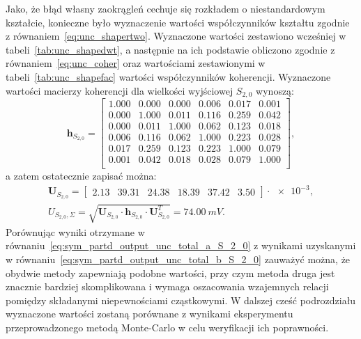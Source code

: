 Jako, że błąd własny zaokrągleń cechuje się rozkładem o niestandardowym kształcie, konieczne było wyznaczenie wartości współczynników kształtu zgodnie z równaniem~\eqref{eq:unc_shapertwo}. Wyznaczone wartości zestawiono wcześniej w tabeli~\ref{tab:unc_shapedwt}, a następnie na ich podstawie obliczono zgodnie z równaniem~\eqref{eq:unc_coher} oraz wartościami zestawionymi w tabeli~\ref{tab:unc_shapefac} wartości współczynników koherencji. Wyznaczone wartości macierzy koherencji dla wielkości wyjściowej $S_{2,0}$ wynoszą:
\begin{equation}
\mathbf{h}_{S_{2,0}} =
\begin{bmatrix}
1.000 & 0.000 & 0.000 & 0.006 & 0.017 & 0.001 \\
0.000 & 1.000 & 0.011 & 0.116 & 0.259 & 0.042 \\
0.000 & 0.011 & 1.000 & 0.062 & 0.123 & 0.018 \\
0.006 & 0.116 & 0.062 & 1.000 & 0.223 & 0.028 \\
0.017 & 0.259 & 0.123 & 0.223 & 1.000 & 0.079 \\
0.001 & 0.042 & 0.018 & 0.028 & 0.079 & 1.000 \\

\end{bmatrix}
\label{eq:sym_partd_output_unc_sumcoherval_S_2_0_a},
\end{equation}
a zatem ostatecznie zapisać można:
\begin{gather}
\mathbf{U}_{S_{2,0}} =
\begin{bmatrix}
\num{2.13} & \num{39.31} & \num{24.38} & \num{18.39} & \num{37.42} & \num{3.50}
\end{bmatrix} \cdot \num{e-3}
\label{eq:sym_partd_output_unc_sumuvectval_S_2_0_a}, \\
U_{S_{2,0},\Sigma} = \sqrt{\mathbf{U}_{S_{2,0}} \cdot \mathbf{h}_{S_{2,0}} \cdot \mathbf{U}_{S_{2,0}}^{T}} = \qty{74.00}{mV} \label{eq:sym_partd_output_unc_total_b_S_2_0}.
\end{gather}
Porównując wyniki otrzymane w równaniu~\eqref{eq:sym_partd_output_unc_total_a_S_2_0} z wynikami uzyskanymi w równaniu~\eqref{eq:sym_partd_output_unc_total_b_S_2_0} zauważyć można, że obydwie metody zapewniają podobne wartości, przy czym metoda druga jest znacznie bardziej skomplikowana i wymaga oszacowania wzajemnych relacji pomiędzy składanymi niepewnościami cząstkowymi. W dalszej cześć podrozdziału wyznaczone wartości zostaną porównane z wynikami eksperymentu przeprowadzonego metodą Monte-Carlo w celu weryfikacji ich poprawności.

